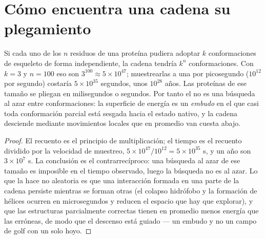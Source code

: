 \section{Cómo encuentra una cadena su plegamiento}

\begin{theorem}\label{thm:b3:structural-biology:levinthal}
Si cada uno de los $n$ residuos de una proteína pudiera adoptar $k$
conformaciones de esqueleto de forma independiente, la cadena tendría
$k^{n}$ conformaciones. Con $k = 3$ y $n = 100$ eso son $3^{100} \approx
5\times 10^{47}$; muestrearlas a una por picosegundo ($10^{12}$ por
segundo) costaría $5\times 10^{35}$ segundos, unos $10^{28}$ años. Las
proteínas de ese tamaño se pliegan en milisegundos o segundos. Por tanto
el  no es una búsqueda al azar entre conformaciones: la
superficie de energía es un \emph{embudo} en el que casi toda
conformación parcial está sesgada hacia el estado nativo, y la cadena
desciende mediante movimientos locales que en promedio van cuesta abajo.
\end{theorem}
\begin{proof}
El recuento es el principio de multiplicación; el tiempo es el recuento
dividido por la velocidad de muestreo, $5\times 10^{47}/10^{12} = 5\times
10^{35}$ s, y un año son $3\times 10^{7}$ s. La conclusión es el
contrarrecíproco: una búsqueda al azar de ese tamaño es imposible en el
tiempo observado, luego la búsqueda no es al azar. Lo que la hace no
aleatoria es que una interacción formada en una parte de la cadena
persiste mientras se forman otras (el colapso hidrófobo y la formación de
hélices ocurren en microsegundos y reducen el espacio que hay que
explorar), y que las estructuras parcialmente correctas tienen en
promedio menos energía que las erróneas, de modo que el descenso está
guiado --- un embudo y no un campo de golf con un solo hoyo.
\end{proof}

